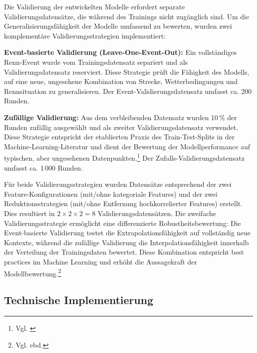 Die Validierung der entwickelten Modelle erfordert separate Validierungsdatensätze, die während des Trainings nicht zugänglich sind. Um die Generalisierungsfähigkeit der Modelle umfassend zu bewerten, wurden zwei komplementäre Validierungsstrategien implementiert:

\textbf{Event-basierte Validierung (Leave-One-Event-Out):}
Ein vollständiges Renn-Event wurde vom Trainingsdatensatz separiert und als Validierungsdatensatz reserviert. Diese Strategie prüft die Fähigkeit des Modells, auf eine neue, ungesehene Kombination von Strecke, Wetterbedingungen und Rennsituation zu generalisieren. Der Event-Validierungsdatensatz umfasst ca. 200 Runden.

\textbf{Zufällige Validierung:}
Aus dem verbleibenden Datensatz wurden 10\,\% der Runden zufällig ausgewählt und als zweiter Validierungsdatensatz verwendet. Diese Strategie entspricht der etablierten Praxis des Train-Test-Splits in der Machine-Learning-Literatur und dient der Bewertung der Modellperformance auf typischen, aber ungesehenen Datenpunkten.\footnote{Vgl. \cite{Baheti2021}} Der Zufalls-Validierungsdatensatz umfasst ca. 1\,000 Runden.

Für beide Validierungsstrategien wurden Datensätze entsprechend der zwei Feature-Konfigurationen (mit/ohne kategoriale Features) und der zwei Reduktionsstrategien (mit/ohne Entfernung hochkorrelierter Features) erstellt. Dies resultiert in $2 \times 2 \times 2 = 8$ Validierungsdatensätzen.
Die zweifache Validierungsstrategie ermöglicht eine differenzierte Robustheitsbewertung: Die Event-basierte Validierung testet die Extrapolationsfähigkeit auf vollständig neue Kontexte, während die zufällige Validierung die Interpolationsfähigkeit innerhalb der Verteilung der Trainingsdaten bewertet. Diese Kombination entspricht best practices im Machine Learning und erhöht die Aussagekraft der Modellbewertung.\footnote{Vgl. ebd.}


\subsection{Technische Implementierung}

